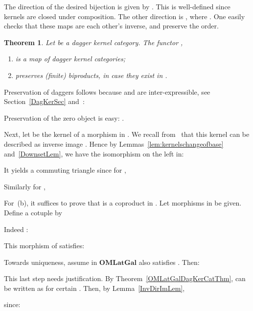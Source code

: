 \documentclass{article}
\newif\ifignore \ignorefalse
\newcommand{\auxproof}[1]{
\ifignore\mbox{}\newline
\textbf{PROOF:} \dotfill\newline
{\it #1}\mbox{}\newline
\textbf{ENDPROOF}\dotfill
\fi}
\newtheorem{theorem}{Theorem}
\newenvironment{proof}[1][Proof]{ \begin{trivlist}\item[\hskip \labelsep {\bfseries #1}]}{ \end{trivlist}}
\newcommand{\QED}{\hspace*{\fill}}
\newcommand{\Cat}[1]{\ensuremath{\mathbf{#1}}}
\begin{document}
\begin{proof}
The direction  of the desired bijection is
given by . This is well-defined since kernels
are closed under composition.  The other direction  is , where . One easily checks that these maps are each other's
inverse, and preserve the order.  \QED
\end{proof}












\begin{theorem}
\label{KSubPreservationThm}
Let  be a dagger kernel category. The functor
,
\begin{enumerate}
\item[(a)] is a map of dagger kernel categories;

\item[(b)] preserves (finite) biproducts, in case they exist in .
\end{enumerate}
\end{theorem}



\begin{proof}
Preservation of daggers follows because  and  are
inter-expressible, see Section~\ref{DagKerSec}
and~\cite[Proposition~4.3]{HeunenJ09a}:


Preservation of the zero object is easy: .

Next, let  be the kernel of a morphism  in . We recall
from~\cite[Corollary~2.5~(ii)]{HeunenJ09a} that this kernel  can be
described as inverse image . Hence by Lemmas~\ref{lem:kernelschangeofbase}
and~\ref{DownsetLem}, we have the isomorphism on the left in:


\noindent It yields a commuting triangle since for ,


\noindent Similarly for , 


For~(b), it suffices to prove that  is a coproduct in .  Let
morphisms  in  be
given. Define a cotuple  by


\noindent Indeed : 


\noindent This morphism  of  satisfies:


\auxproof{
\noindent In the other direction, using that meets  are
preserved under pullback,

}

\noindent Towards uniqueness, assume  in \Cat{OMLatGal} also satisfies . Then:


\noindent This last step needs justification. By
Theorem~\ref{OMLatGalDagKerCatThm},  can
be written as  for certain . Then, by
Lemma~\ref{InvDirImLem},


\noindent since:

\end{proof}
\end{document}
